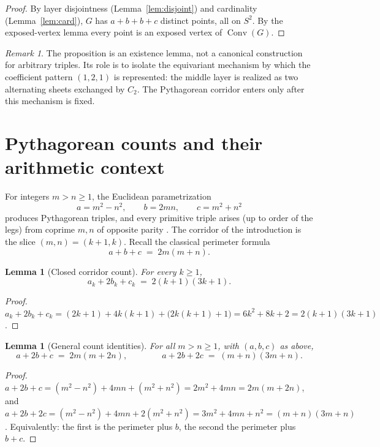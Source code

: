 \documentclass[11pt]{article}
\newtheorem{lemma}[theorem]{Lemma}
\theoremstyle{definition}
\theoremstyle{remark}
\newtheorem{remark}[theorem]{Remark}
\newcommand{\Conv}{\operatorname{Conv}}
\newcommand{\Ctwo}{C_2}
\begin{document}
\begin{proof}
By layer disjointness (Lemma~\ref{lem:disjoint}) and cardinality
(Lemma~\ref{lem:card}), $G$ has $a+b+b+c$ distinct points, all on $S^2$.
By the exposed-vertex lemma every point is an exposed vertex of
$\Conv(G)$.
\end{proof}

\begin{remark}\label{rem:existence}
The proposition is an existence lemma, not a canonical construction for
arbitrary triples. Its role is to isolate the equivariant mechanism by
which the coefficient pattern $(1,2,1)$ is represented: the middle layer
is realized as two alternating sheets exchanged by $\Ctwo$. The
Pythagorean corridor enters only after this mechanism is fixed.
\end{remark}

\section{Pythagorean counts and their arithmetic context}\label{sec:arith}

For integers $m>n\ge1$, the Euclidean parametrization
\[
a=m^2-n^2,\qquad b=2mn,\qquad c=m^2+n^2
\]
produces Pythagorean triples, and every primitive triple arises (up to
order of the legs) from coprime $m,n$ of opposite parity
\cite{sierpinski}. The corridor of the introduction is the slice
$(m,n)=(k+1,k)$. Recall the classical perimeter formula
\[
a+b+c \;=\; 2m(m+n).
\]

\begin{lemma}[Closed corridor count]\label{lem:corridor}
For every $k\ge1$,
\[
a_k+2b_k+c_k \;=\; 2(k+1)(3k+1).
\]
\end{lemma}

\begin{proof}
$a_k+2b_k+c_k=(2k+1)+4k(k+1)+\bigl(2k(k+1)+1\bigr)=6k^2+8k+2=2(k+1)(3k+1)$.
\end{proof}

\begin{lemma}[General count identities]\label{lem:identities}
For all $m>n\ge1$, with $(a,b,c)$ as above,
\[
a+2b+c \;=\; 2m(m+2n),
\qquad\qquad
a+2b+2c \;=\; (m+n)(3m+n).
\]
\end{lemma}

\begin{proof}
$a+2b+c=(m^2-n^2)+4mn+(m^2+n^2)=2m^2+4mn=2m(m+2n)$, and
$a+2b+2c=(m^2-n^2)+4mn+2(m^2+n^2)=3m^2+4mn+n^2=(m+n)(3m+n)$. Equivalently:
the first is the perimeter plus $b$, the second the perimeter plus $b+c$.
\end{proof}
\end{document}
